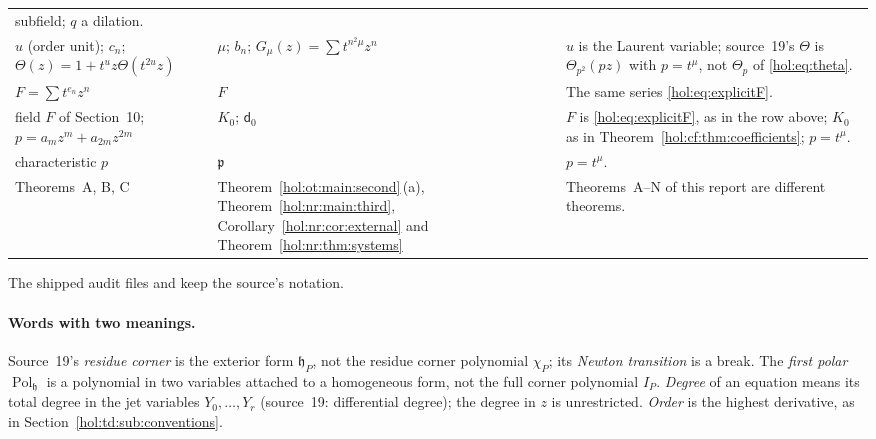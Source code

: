 \documentclass[11pt]{article}
\numberwithin{equation}{section}
\theoremstyle{definition}
\theoremstyle{remark}
\begin{document}
{\begin{longtable}{@{}>{\raggedright\arraybackslash}p{}
>{\raggedright\arraybackslash}p{}
>{\raggedright\arraybackslash}p{}@{}}
subfield; $q$ a dilation.\\
$u$ (order unit); $c_n$; $\Theta(z)=1+t^uz\Theta(t^{2u}z)$ & $\mu$; $b_n$;
$G_\mu(z)=\sum t^{n^2\mu}z^n$ & $u$ is the Laurent variable; source~19's
$\Theta$ is $\Theta_{p^2}(pz)$ with $p=t^\mu$, not $\Theta_p$ of
\eqref{hol:eq:theta}.\\
$F=\sum t^{e_n}z^n$ & $F$ & The same series \eqref{hol:eq:explicitF}.\\
field $F$ of Section~10; $p=a_mz^m+a_{2m}z^{2m}$ & $K_0$; $\mathsf d_0$ & $F$
is \eqref{hol:eq:explicitF}, as in the row above; $K_0$ as in
Theorem~\ref{hol:cf:thm:coefficients}; $p=t^\mu$.\\
characteristic $p$ & $\mathfrak p$ & $p=t^\mu$.\\
Theorems~A, B, C & Theorem~\ref{hol:ot:main:second}\,(a),
Theorem~\ref{hol:nr:main:third}, Corollary~\ref{hol:nr:cor:external}
and Theorem~\ref{hol:nr:thm:systems} & Theorems~A--N of this report are different
theorems.\\
\bottomrule
\end{longtable}}
The shipped audit files  and
 keep the source's notation.

\paragraph{Words with two meanings.}
Source~19's \emph{residue corner} is the exterior form $\mathfrak h_P$, not
the residue corner polynomial $\chi_P$; its \emph{Newton transition} is a
break. The \emph{first polar} $\operatorname{Pol}_{\mathfrak h}$ is a
polynomial in two variables attached to a homogeneous form, not the full corner
polynomial $I_P$. \emph{Degree} of an equation means its total degree in the
jet variables $Y_0,\ldots,Y_r$ (source~19: differential degree); the degree
in $z$ is unrestricted. \emph{Order} is the highest derivative, as in
Section~\ref{hol:td:sub:conventions}.
\end{document}
